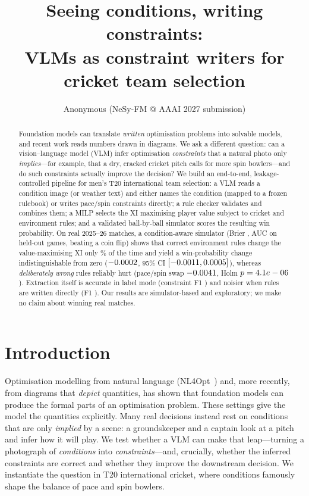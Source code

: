 \documentclass[11pt]{article}
\title{Seeing conditions, writing constraints:\\ VLMs as constraint writers for cricket team selection}
\author{Anonymous (NeSy-FM @ AAAI 2027 submission)}
\date{}
\begin{document}
\maketitle

\begin{abstract}
Foundation models can translate \emph{written} optimisation problems into solvable models, and
recent work reads numbers drawn in diagrams. We ask a different question: can a vision--language
model (VLM) infer optimisation \emph{constraints} that a natural photo only \emph{implies}---for
example, that a dry, cracked cricket pitch calls for more spin bowlers---and do such constraints
actually improve the decision? We build an end-to-end, leakage-controlled pipeline for men's T20
international team selection: a VLM reads a condition image (or weather text) and either names the
condition (mapped to a frozen rulebook) or writes pace/spin constraints directly; a rule checker
validates and combines them; a MILP selects the XI maximising player value subject to cricket and
environment rules; and a validated ball-by-ball simulator scores the resulting win probability. On
\SetRN{} real 2025--26 matches, a condition-aware simulator (Brier \SimCABrier, AUC \SimCAAUC{} on
held-out games, beating a coin flip) shows that correct environment rules change the value-maximising
XI only \OracleChange\% of the time and yield a win-probability change indistinguishable from zero
($-0.0002$, 95\% CI $[-0.0011, 0.0005]$), whereas \emph{deliberately wrong} rules
reliably hurt (pace/spin swap $-0.0041$, Holm $p=4.1e-06$). Extraction itself is accurate in
label mode (constraint F1 \ExLabelF) and noisier when rules are written directly (F1 \ExRulesF). Our
results are simulator-based and exploratory; we make no claim about winning real matches.
\end{abstract}

\section{Introduction}
Optimisation modelling from natural language (NL4Opt~\cite{nl4opt}) and, more recently, from
diagrams that \emph{depict} quantities, has shown that foundation models can produce the formal parts
of an optimisation problem. These settings give the model the quantities explicitly. Many real
decisions instead rest on conditions that are only \emph{implied} by a scene: a groundskeeper and a
captain look at a pitch and infer how it will play. We test whether a VLM can make that leap---turning
a photograph of \emph{conditions} into \emph{constraints}---and, crucially, whether the inferred
constraints are correct and whether they improve the downstream decision. We instantiate the question
in T20 international cricket, where conditions famously shape the balance of pace and spin bowlers.
\end{document}
